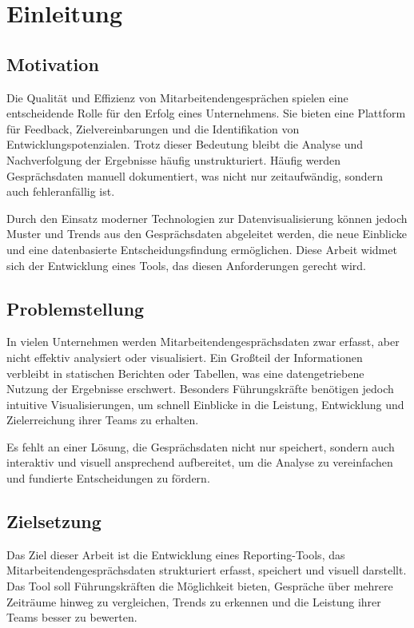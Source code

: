 \chapter{Einleitung}
\label{chap:einleitung}

\section{Motivation}
Die Qualität und Effizienz von Mitarbeitendengesprächen spielen eine entscheidende Rolle für den Erfolg eines Unternehmens. Sie bieten eine Plattform für Feedback, Zielvereinbarungen und die Identifikation von Entwicklungspotenzialen. Trotz dieser Bedeutung bleibt die Analyse und Nachverfolgung der Ergebnisse häufig unstrukturiert. Häufig werden Gesprächsdaten manuell dokumentiert, was nicht nur zeitaufwändig, sondern auch fehleranfällig ist.

Durch den Einsatz moderner Technologien zur Datenvisualisierung können jedoch Muster und Trends aus den Gesprächsdaten abgeleitet werden, die neue Einblicke und eine datenbasierte Entscheidungsfindung ermöglichen. Diese Arbeit widmet sich der Entwicklung eines Tools, das diesen Anforderungen gerecht wird.

\section{Problemstellung}
In vielen Unternehmen werden Mitarbeitendengesprächsdaten zwar erfasst, aber nicht effektiv analysiert oder visualisiert. Ein Großteil der Informationen verbleibt in statischen Berichten oder Tabellen, was eine datengetriebene Nutzung der Ergebnisse erschwert. Besonders Führungskräfte benötigen jedoch intuitive Visualisierungen, um schnell Einblicke in die Leistung, Entwicklung und Zielerreichung ihrer Teams zu erhalten.

Es fehlt an einer Lösung, die Gesprächsdaten nicht nur speichert, sondern auch interaktiv und visuell ansprechend aufbereitet, um die Analyse zu vereinfachen und fundierte Entscheidungen zu fördern.

\section{Zielsetzung}
Das Ziel dieser Arbeit ist die Entwicklung eines Reporting-Tools, das Mitarbeitendengesprächsdaten strukturiert erfasst, speichert und visuell darstellt. Das Tool soll Führungskräften die Möglichkeit bieten, Gespräche über mehrere Zeiträume hinweg zu vergleichen, Trends zu erkennen und die Leistung ihrer Teams besser zu bewerten.

